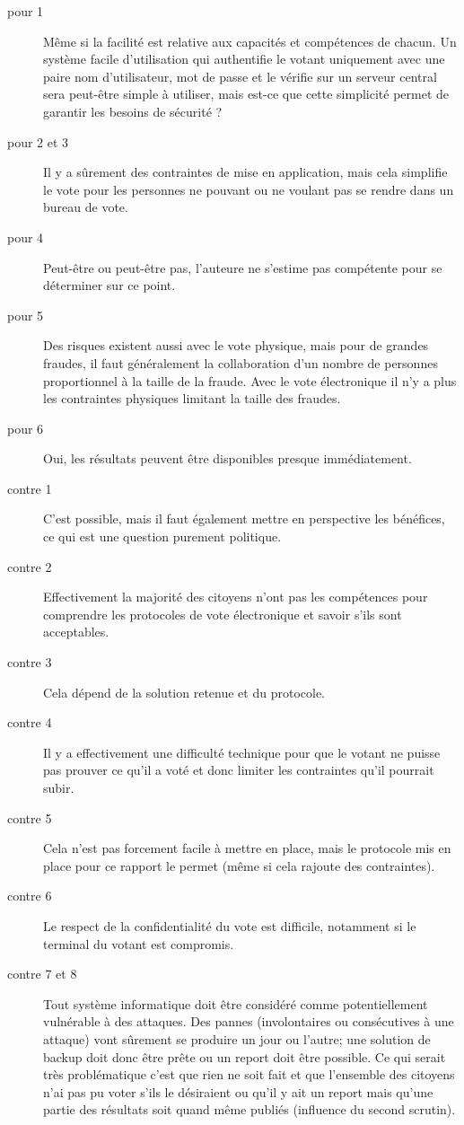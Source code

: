 \documentclass[../report]{subfiles}
\begin{document}
\begin{description}
	\item[pour 1] Même si la facilité est relative aux capacités et compétences de chacun. 
		Un système facile d'utilisation qui authentifie le votant uniquement avec une 
		paire nom d'utilisateur, mot de passe et le vérifie sur un serveur central sera 
		peut-être simple à utiliser, mais est-ce que cette simplicité permet de garantir 
		les besoins de sécurité ?
	\item[pour 2 et 3] Il y a sûrement des contraintes de mise en application, mais cela simplifie 
	 	le vote pour les personnes ne pouvant ou ne voulant pas se rendre dans un bureau de vote.
 	\item[pour 4] Peut-être ou peut-être pas, l'auteure ne s'estime pas compétente pour se déterminer sur ce point.
 	\item[pour 5] Des risques existent aussi avec le vote physique, mais pour de grandes fraudes, il 
 		faut généralement la collaboration d'un nombre de personnes proportionnel à la taille de la fraude.
 		Avec le vote électronique il n'y a plus les contraintes physiques limitant la taille des fraudes.
 	\item[pour 6] Oui, les résultats peuvent être disponibles presque immédiatement.
 	\item[contre 1] C'est possible, mais il faut également mettre en perspective les bénéfices, ce qui est une question purement politique.
 	\item[contre 2] Effectivement la majorité des citoyens n'ont pas les compétences pour comprendre 
 		les protocoles de vote électronique et savoir s'ils sont acceptables.
 	\item[contre 3] Cela dépend de la solution retenue et du protocole.
 	\item[contre 4] Il y a effectivement une difficulté technique pour que le votant ne puisse pas
 		prouver ce qu'il a voté et donc limiter les contraintes qu'il pourrait subir.
 	\item[contre 5] Cela n'est pas forcement facile à mettre en place, mais le protocole mis en place 
 		pour ce rapport le permet (même si cela rajoute des contraintes).
 	\item[contre 6] Le respect de la confidentialité du vote est difficile, notamment si le terminal du votant est compromis.
 	\item[contre 7 et 8] Tout système informatique doit être considéré comme potentiellement vulnérable à des attaques.
 		Des pannes (involontaires ou consécutives à une attaque) vont sûrement se produire un jour ou l'autre; une solution de backup
 		doit donc être prête ou un report doit être possible. Ce qui serait très problématique c'est que rien ne soit fait 
 		et que l'ensemble des citoyens n'ai pas pu voter s'ils le désiraient ou qu'il y ait un report mais qu'une partie des 
 		résultats soit quand même publiés (influence du second scrutin).
\end{description}
\end{document}
